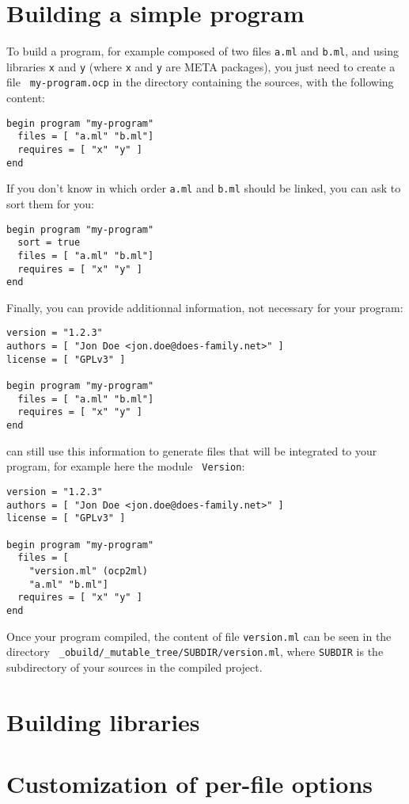
\section{Building a simple program}

To build a program, for example composed of two files {\tt a.ml} and
{\tt b.ml}, and using libraries {\tt x} and {\tt y} (where {\tt x} and
{\tt y} are META packages), you just need to create a file {\tt
  my-program.ocp} in the directory containing the sources, with the
following content:

\begin{verbatim}
begin program "my-program"
  files = [ "a.ml" "b.ml"]
  requires = [ "x" "y" ]
end
\end{verbatim}

If you don't know in which order {\tt a.ml} and {\tt b.ml} should be
linked, you can ask \ocpbuild{} to sort them for you:

\begin{verbatim}
begin program "my-program"
  sort = true
  files = [ "a.ml" "b.ml"]
  requires = [ "x" "y" ]
end
\end{verbatim}

Finally, you can provide additionnal information, not necessary for
your program:
\begin{verbatim}
version = "1.2.3"
authors = [ "Jon Doe <jon.doe@does-family.net>" ]
license = [ "GPLv3" ]

begin program "my-program"
  files = [ "a.ml" "b.ml"]
  requires = [ "x" "y" ]
end
\end{verbatim}

\ocpbuild{} can still use this information to generate files that will
be integrated to your program, for example here the module {\tt
  Version}:
\begin{verbatim}
version = "1.2.3"
authors = [ "Jon Doe <jon.doe@does-family.net>" ]
license = [ "GPLv3" ]

begin program "my-program"
  files = [ 
    "version.ml" (ocp2ml)
    "a.ml" "b.ml"]
  requires = [ "x" "y" ]
end
\end{verbatim}

Once your program compiled, the content of file {\tt version.ml} can
be seen in the directory {\tt
  \_obuild/\_mutable\_tree/SUBDIR/version.ml}, where {\tt SUBDIR} is
the subdirectory of your sources in the compiled project.

\section{Building libraries}

\section{Customization of per-file options}
